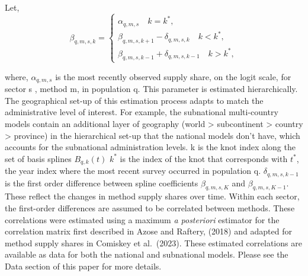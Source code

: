 Let,
\begin{equation}
    \beta_{q,m, s, k}=\left\{\begin{array}{c}
    \alpha_{q,m,s} \quad k=k^*, \\
    \beta_{q,m,s, k+1}-\delta_{q, m, s, k} \quad k<k^*, \\
    \beta_{q,m,s, k-1}+\delta_{q, m, s, k-1} \quad k>k^*,
\end{array}\right.
   \label{eq:eq3}
\end{equation}

where, \newline
\(\alpha_{q,m,s}\) is the most recently observed supply share, on the logit scale, for sector s , method m, in population q. This parameter is estimated hierarchically. The geographical set-up of this estimation process adapts to match the administrative level of interest. For example, the subnational multi-country models contain an additional layer of geography (world \textgreater{} subcontinent \textgreater{} country \textgreater{} province) in the hierarchical set-up that the national models don't have, which accounts for the subnational administration levels. \newline
k is the knot index along the set of basis splines \(B_{q,k}(t)\) \newline
\(k^*\) is the index of the knot that corresponds with \(t^*\), the year index where the most recent survey occurred in population q. \newline
\(\delta_{q,m,s,k-1}\) is the first order difference between spline coefficients \(\beta_{q,m, s, K}\) and \(\beta_{q,m, s,K-1}\). These reflect the changes in method supply shares over time. Within each sector, the first-order differences are assumed to be correlated between methods. These correlations were estimated using a maximum \textit{a posteriori} estimator for the correlation matrix first described in Azose and Raftery, (2018) and adapted for method supply shares in Comiskey et al.~(2023). These estimated correlations are available as data for both the national and subnational models. Please see the Data section of this paper for more details. \newline



